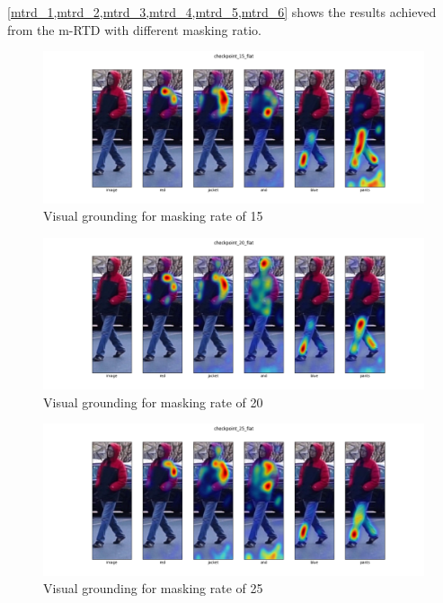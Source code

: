 \ref{mtrd_1,mtrd_2,mtrd_3,mtrd_4,mtrd_5,mtrd_6} shows the results achieved from the m-RTD with different masking ratio.


\begin{figure}[htbp]
  \includegraphics[width=\linewidth]{img/mrtd_masking_ratio/mrtd-checkpoint_15_flat.png}
  \caption{Visual grounding for masking rate of 15}
  \label{fig:mtrd_1}
\end{figure}

\begin{figure}[htbp]
  \includegraphics[width=\linewidth]{img/mrtd_masking_ratio/mrtd-checkpoint_20_flat.png}
  \caption{Visual grounding for masking rate of 20}
  \label{fig:mtrd_2}
\end{figure}

\begin{figure}[htbp]
  \includegraphics[width=\linewidth]{img/mrtd_masking_ratio/mrtd-checkpoint_25_flat.png}
  \caption{Visual grounding for masking rate of 25} 
  \label{fig:mtrd_3} 
\end{figure}

